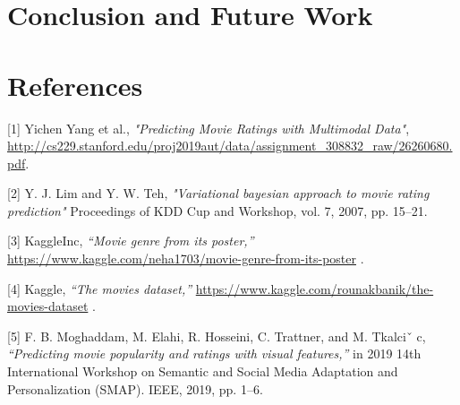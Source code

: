 \documentclass{article}
\begin{document}
\section{Conclusion and Future Work}





\section*{References}
\label{reference}

\small

[1] Yichen Yang et al., {\it "Predicting Movie Ratings with Multimodal Data"},
\url{http://cs229.stanford.edu/proj2019aut/data/assignment_308832_raw/26260680.pdf}.

[2] Y. J. Lim and Y. W. Teh, {\it "Variational bayesian approach to movie rating prediction"}  Proceedings of KDD Cup and Workshop, vol. 7, 2007, pp. 15–21.

[3] KaggleInc, {\it “Movie genre from its poster,”} 
\url{https://www.kaggle.com/neha1703/movie-genre-from-its-poster} .

[4] Kaggle, {\it “The movies dataset,” } \url{https://www.kaggle.com/rounakbanik/the-movies-dataset} .

[5] F. B. Moghaddam, M. Elahi, R. Hosseini, C. Trattner, and M. Tkalciˇ c, {\it“Predicting movie popularity and ratings with visual features,” } in 2019 14th International Workshop on Semantic and Social Media Adaptation and Personalization (SMAP). IEEE, 2019, pp. 1–6.
\end{document}

